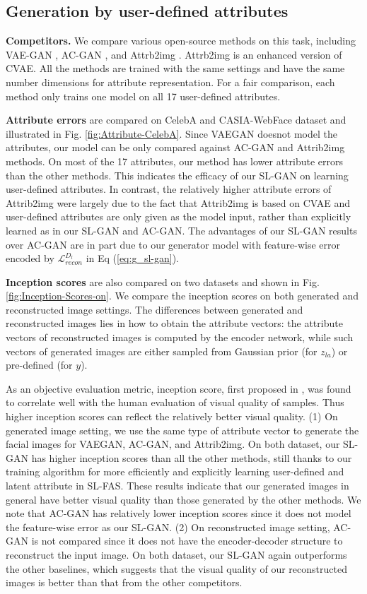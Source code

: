 \documentclass[10pt,letterpaper,twocolumn]{article}
\begin{document}
\subsection{Generation by user-defined attributes}

\noindent \textbf{Competitors.} We compare various open-source methods
on this task, including VAE-GAN \cite{vaegan}, AC-GAN \cite{auxgan},
and Attrb2img \cite{yan2016eccv}. Attrb2img is an enhanced version
of CVAE. All the methods are trained with the same settings and have
the same number dimensions for attribute representation. For a fair
comparison, each method only trains one model on all 17 user-defined
attributes.

\noindent \textbf{Attribute errors} are compared on CelebA and CASIA-WebFace
dataset and illustrated in Fig. \ref{fig:Attribute-CelebA}. Since
VAEGAN doesnot model the attributes, our model can be only compared
against AC-GAN and Attrib2img methods. On most of the 17 attributes,
our method has lower attribute errors than the other methods. This
indicates the efficacy of our SL-GAN on learning user-defined attributes.
In contrast, the relatively higher attribute errors of Attrib2img
were largely due to the fact that Attrib2img is based on CVAE and
user-defined attributes are only given as the model input, rather
than explicitly learned as in our SL-GAN and AC-GAN. The advantages
of our SL-GAN results over AC-GAN are in part due to our generator
model with feature-wise error encoded by $\mathcal{L}_{recon}^{D_{l}}$
in Eq (\ref{eq:g_sl-gan}).

\noindent \textbf{Inception scores }are also compared on two datasets
and shown in Fig. \ref{fig:Inception-Scores-on}. We compare the inception
scores on both generated and reconstructed image settings. The differences
between generated and reconstructed images lies in how to obtain the
attribute vectors: the attribute vectors of reconstructed images is
computed by the encoder network, while such vectors of generated images
are either sampled from Gaussian prior (for $z_{la}$) or pre-defined
(for $y$).

As an objective evaluation metric, inception score, first proposed
in \cite{tim2016nips}, was found to correlate well with the human
evaluation of visual quality of samples. Thus higher inception scores
can reflect the relatively better visual quality. (1) On generated
image setting, we use the same type of attribute vector to generate
the facial images for VAEGAN, AC-GAN, and Attrib2img. On both dataset,
our SL-GAN has higher inception scores than all the other methods,
still thanks to our training algorithm for more efficiently and explicitly
learning user-defined and latent attribute in SL-FAS. These results
indicate that our generated images in general have better visual quality
than those generated by the other methods. We note that AC-GAN has
relatively lower inception scores since it does not model the feature-wise
error as our SL-GAN. (2) On reconstructed image setting, AC-GAN is
not compared since it does not have the encoder-decoder structure
to reconstruct the input image. On both dataset, our SL-GAN again
outperforms the other baselines, which suggests that the visual quality
of our reconstructed images is better than that from the other competitors.
\end{document}
